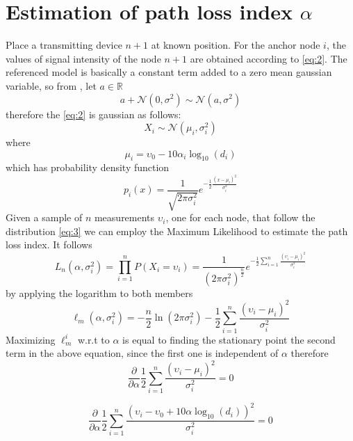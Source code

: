\documentclass[12pt,twoside]{report}
\begin{document}
\section{Estimation of path loss index $\alpha$}
Place a transmitting device $n+1$ at known position. For the anchor node $i$, the values of signal intensity of the node $n+1$ are obtained according to \ref{eq:2}. The referenced model is basically a constant term added to a zero mean gaussian variable, so from \cite{alma9926534668905776}, let $a \in \mathbb{R}$
\begin{equation}
a+\mathcal{N}(0,\sigma^2)\sim\mathcal{N}(a,\sigma^2)
\end{equation} therefore the \ref{eq:2} is gaussian as follows:
\begin{equation}
    X_i\sim \mathcal{N}(\mu_i,\sigma^2_i)
    \label{eq:3}
\end{equation}
where 
\begin{equation}
    \mu_i = \upsilon_0-10\alpha_i\log_{10}(d_i)
\end{equation}
which has probability density function
\begin{equation}
    p_i(x)=\frac{1}{\sqrt{2\pi\sigma_i^2}}e^{-\frac{1}{2}\frac{(x-\mu_i)^2}{\sigma^2_i}}
\end{equation} 
Given a sample of $n$ measurements $\upsilon_i$, one for each node, that follow the distribution \ref{eq:3} we can employ the Maximum Likelihood to estimate the path loss index. It follows
\begin{equation}
    L_n(\alpha,\sigma_i^2)=\prod_{i=1}^nP(X_i=\upsilon_i)=
    \frac{1}{(2\pi\sigma_i^2)^{\frac{n}{2}}}e^{-\frac{1}{2}\sum_{i=1}^n\frac{(\upsilon_i-\mu_i)^2}{\sigma^2_i}}
\end{equation}
by applying the logarithm to both members
\begin{equation}
    \ell_m(\alpha,\sigma^2_i)=-\frac{n}{2}\ln(2\pi\sigma^2_i)-\frac{1}{2}\sum_{i=1}^n\frac{(\upsilon_i-\mu_i)^2}{\sigma^2_i}
    \label{eq:4}
\end{equation}
Maximizing $\ell_m^i$ w.r.t to $\alpha$ is equal to finding the stationary point the second term in the above equation, since the first one is independent of $\alpha$ therefore \cite{MUNOZ200923} 
\begin{equation}
\frac{\partial}{\partial \alpha} \frac{1}{2}\sum_{i=1}^n\frac{(\upsilon_i-\mu_i)^2}{\sigma^2_i} =0
\end{equation}

\begin{equation}
\frac{\partial}{\partial \alpha} \frac{1}{2}\sum_{i=1}^n\frac{(\upsilon_i-\upsilon_0+10\alpha\log_{10}(d_i))^2}{\sigma^2_i} =0
\end{equation}
\end{document}
